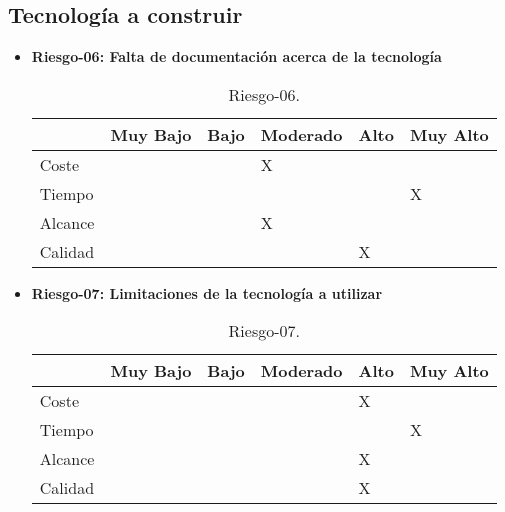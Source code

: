 \subsection{Tecnología a construir}
\begin{itemize}

	\item \textbf{Riesgo-06: Falta de documentación acerca de la tecnología}
	\begin{table}[H]
	\begin{center}
	\begin{tabular}{ l l l l l l }
	\hline
	& Muy Bajo & Bajo & Moderado & Alto & Muy Alto \\ \hline \hline
	Coste &  &  & X & &  \\ \hline
	Tiempo &  &  &  &  & X \\ \hline
	Alcance &  &  & X & &  \\ \hline
	Calidad &  &  &  & X &  \\ \hline
	\end{tabular}
	\caption{Riesgo-06.}
	\label{Riesgo-06}
	\end{center}
	\end{table}
	\item \textbf{Riesgo-07: Limitaciones de la tecnología a utilizar}
	\begin{table}[H]
	\begin{center}
	\begin{tabular}{ l l l l l l }
	\hline
	& Muy Bajo & Bajo & Moderado & Alto & Muy Alto \\ \hline \hline
	Coste &  &  &  & X &  \\ \hline
	Tiempo &  &  &  &  & X \\ \hline
	Alcance &  &  &  & X &  \\ \hline
	Calidad &  &  &  & X &  \\ \hline
	\end{tabular}
	\caption{Riesgo-07.}
	\label{Riesgo-07}
	\end{center}
	\end{table}
\end{itemize}

